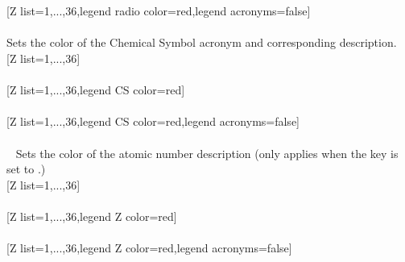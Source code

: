 \\ [10pt]\makebox[\linewidth][c]{\scalebox{.6}{\pgfPT[Z list={1,...,36},legend radio color=red]}}%
\\ [10pt][Z list={1,...,36},legend radio color=red,legend acronyms=false]%
\\ [10pt]\makebox[\linewidth][c]{\scalebox{.6}{\pgfPT[Z list={1,...,36},legend radio color=red,legend acronyms=false]}}%
\\ [0pt]\pgfPTendoption%
\vfill%
\label{option_legend CS color}%
%
{Sets the color of the Chemical Symbol acronym and corresponding description.}%
\\ [5pt][Z list={1,...,36}]%
\\ [10pt]\makebox[\linewidth][c]{\scalebox{.6}{\pgfPT[Z list={1,...,36}]}}%
\\ [10pt][Z list={1,...,36},legend CS color=red]%
\\ [10pt]\makebox[\linewidth][c]{\scalebox{.6}{\pgfPT[Z list={1,...,36},legend CS color=red]}}%
\\ [10pt][Z list={1,...,36},legend CS color=red,legend acronyms=false]%
\\ [10pt]\makebox[\linewidth][c]{\scalebox{.6}{\pgfPT[Z list={1,...,36},legend CS color=red,legend acronyms=false]}}%
\\ [0pt]\pgfPTendoption%
\newpage\vspace{-34pt}\ %
\label{option_legend Z color}%
%
{Sets the color of the atomic number description (only applies when the key  is set to .)}%
\\ [5pt][Z list={1,...,36}]%
\\ [5pt]\makebox[\linewidth][c]{\scalebox{.6}{\pgfPT[Z list={1,...,36}]}}%
\\ [10pt][Z list={1,...,36},legend Z color=red]%
\\ [5pt]\makebox[\linewidth][c]{\scalebox{.6}{\pgfPT[Z list={1,...,36},legend Z color=red]}}%
\\ [10pt][Z list={1,...,36},legend Z color=red,legend acronyms=false]%
\\ [5pt]\makebox[\linewidth][c]{\scalebox{.6}{\pgfPT[Z list={1,...,36},legend Z color=red,legend acronyms=false]}}%
\\ [0pt]\pgfPTendoption%
\newpage\vspace{-34pt}\ %
